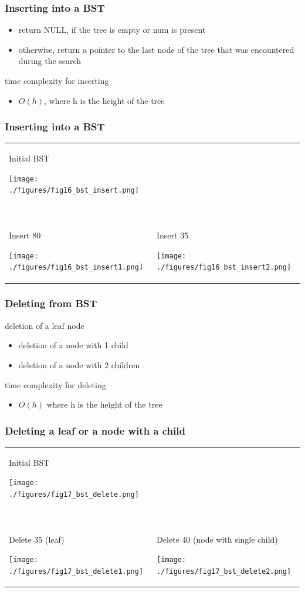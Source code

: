 \documentclass[newPxFont,sthlmFooter,nooffset]{beamer}
\begin{document}
\begin{frame}[t, fragile]
  \frametitle{Inserting into a BST}


\begin{itemize}
\item return NULL, if the tree is empty or num is present
\item otherwise, return a pointer to the last node of the tree that
  was encountered during the search
\end{itemize}

time complexity for inserting
\begin{itemize}
\item  $O(h)$, where h is the height of the tree
\end{itemize}

\end{frame}


\begin{frame}[t]
  \frametitle{Inserting into a BST}
  \begin{tabular}{p{} p{}}
Initial BST

    \texttt{[image: ./figures/fig16\_bst\_insert.png]}
&   ~\\
~& ~\\
Insert 80

    \texttt{[image: ./figures/fig16\_bst\_insert1.png]}
&
Insert 35

    \texttt{[image: ./figures/fig16\_bst\_insert2.png]}
\\
  \end{tabular}
\end{frame}


\begin{frame}[t]
  \frametitle{Deleting from  BST}
deletion of a leaf node
\begin{itemize}
\item deletion of a node with 1 child
\item deletion of a node with 2
  children
\end{itemize}



time complexity for deleting
\begin{itemize}
\item $O(h)$ where h is the height of the tree
\end{itemize}

\end{frame}


\begin{frame}[t]
  \frametitle{Deleting a leaf or a node with a child}
  \begin{tabular}{p{} p{}}
Initial BST

    \texttt{[image: ./figures/fig17\_bst\_delete.png]}
&   ~\\
~& ~\\
Delete 35 (leaf)

    \texttt{[image: ./figures/fig17\_bst\_delete1.png]}
&
Delete 40 (node with single child)

    \texttt{[image: ./figures/fig17\_bst\_delete2.png]}
\\
  \end{tabular}
\end{frame}
\end{document}
